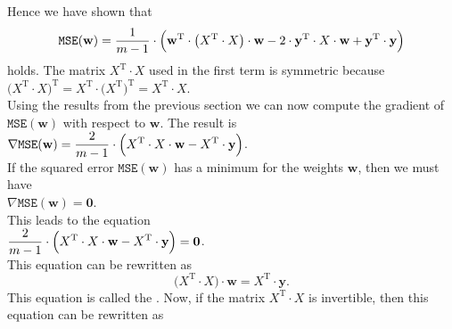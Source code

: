 Hence we have shown that
\begin{equation}
  \label{eq:squared-error-4}
  \mathtt{MSE}(\mathbf{w}) = \displaystyle \frac{1}{m-1} \cdot \Bigl(\mathbf{w}^\textrm{T} \cdot \bigl(X^\textrm{T} \cdot X\bigr) \cdot \mathbf{w} 
                                             - 2 \cdot \textbf{y}^\textrm{T} \cdot X \cdot \mathbf{w} 
                                             + \mathbf{y}^\textrm{T} \cdot \mathbf{y}
                                        \Bigr)
\end{equation}
holds.  The matrix $X^\textrm{T} \cdot X$ used in the first term is symmetric because
\\[0.2cm]
\hspace*{1.3cm}
$\bigl(X^\textrm{T} \cdot X\bigr)^\textrm{T} = X^\textrm{T} \cdot \bigl(X^\textrm{T}\bigr)^\textrm{T} = X^\textrm{T} \cdot X$.
\\[0.2cm]
Using the results from the previous section we can now compute the gradient of $\mathtt{MSE}(\mathbf{w})$ with respect to
$\mathbf{w}$.  The result is
\\[0.2cm]
\hspace*{1.3cm}
$\displaystyle \nabla \mathtt{MSE}(\mathbf{w}) = \frac{2}{m-1} \cdot \Bigl(X^\textrm{T} \cdot X \cdot \mathbf{w} - X^\textrm{T} \cdot \mathbf{y}\Bigr)$.
\\[0.2cm]
If the squared error $\mathtt{MSE}(\mathbf{w})$ has a minimum for the weights $\mathbf{w}$, then we must have
\\[0.2cm]
\hspace*{1.3cm}
$\nabla \mathtt{MSE}(\mathbf{w}) = \mathbf{0}$.
\\[0.2cm]
This leads to the equation
\\[0.2cm]
\hspace*{1.3cm}
$\displaystyle\frac{2}{m-1} \cdot \Bigl(X^\textrm{T} \cdot X \cdot \mathbf{w} - X^\textrm{T} \cdot \mathbf{y}\Bigr) = \mathbf{0}$.
\\[0.2cm]
This equation can be rewritten as
\begin{equation}
  \label{eq:normal-equation}
  \bigl(X^\textrm{T} \cdot X\bigr) \cdot \mathbf{w} = X^\textrm{T} \cdot \mathbf{y}.          
\end{equation}
This equation is called the .
Now, if the matrix $X^\textrm{T} \cdot X$ is invertible, then this equation can be rewritten as
\\[0.2cm]
\hspace*{1.3cm}
\colorbox{red}{}
